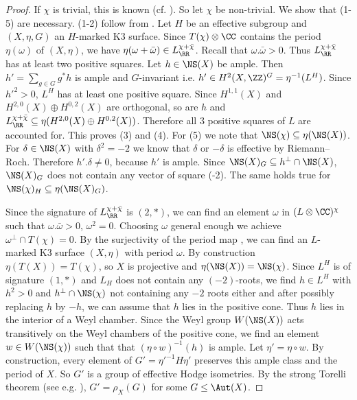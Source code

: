 \begin{proof}
  If $\chi$ is trivial, this is known (cf. \cite[4.2, 4.3]{nikulin1980}).
  So let $\chi$ be non-trivial. We show that (1-5) are necessary. (1-2) follow from \cite[4.2]{nikulin1980}. Let $H$ be an effective subgroup and $(X,\eta,G)$ an $H$-marked K3 surface.
  Since $T(\chi)\otimes \CC$ contains the period $\eta(\omega)$ of $(X,\eta)$, we have $\eta(\omega+\bar \omega) \in L_\RR^{\chi+\bar \chi}$.
  Recall that $\omega.\bar \omega >0$. Thus $L_\RR^{\chi+\bar \chi}$ has at least two positive squares.
  Let $h \in \NS(X)$ be ample. Then $h' = \sum_{g\in G} g^*h$ is ample and $G$-invariant i.e. $h' \in H^2(X,\ZZ)^G=\eta^{-1}(L^H)$. Since $h'^2>0$, $L^H$ has at least one positive square. Since $H^{1,1}(X)$ and $H^{2,0}(X)\oplus H^{0,2}(X)$ are orthogonal, so are $h$ and $L_\RR^{\chi+\bar \chi}\subseteq \eta(H^{2,0}(X)\oplus H^{0,2}(X))$. Therefore all $3$ positive squares of $L$ are accounted for. This proves (3) and (4).
  For (5) we note that $\NS(\chi)\subseteq \eta(\NS(X))$.
  For $\delta \in \NS(X)$ with $\delta^2=-2$ we know that $\delta$ or $-\delta$ is effective by Riemann--Roch.
  Therefore $h'.\delta \neq 0$, because $h'$ is ample.
  Since $\NS(X)_G \subseteq h^\perp \cap \NS(X)$,
  $\NS(X)_G$ does not contain any vector of square (-2).
  The same holds true for $\NS(\chi)_H\subseteq \eta(\NS(X)_G)$.

Since the signature of $L^{\chi+\bar\chi}_\RR$ is $(2,*)$, we can find an element $\omega$ in $(L\otimes \CC)^\chi$ such that
  $\omega.\bar \omega>0$, $\omega^2=0$. Choosing $\omega$ general enough we achieve $\omega^\perp \cap T(\chi) = 0$. By the surjectivity of the period map \cite[VII (14.1)]{bhpv}, we can find an $L$-marked K3 surface $(X,\eta)$ with period $\omega$.
  By construction $\eta(T(X)) = T(\chi)$, so $X$ is projective and $\eta(\NS(X)) = \NS(\chi)$.
Since $L^H$ is of signature $(1,*)$ and $L_H$ does not contain any $(-2)$-roots, we find $h \in L^H$ with $h^2>0$ and $h^\perp \cap \NS(\chi)$ not containing any $-2$ roots either and after possibly replacing $h$ by $-h$, we can assume that $h$ lies in the positive cone. Thus $h$ lies in the interior of a Weyl chamber.
Since the Weyl group $W(\NS(X))$ acts transitively on the Weyl chambers of the positive cone, we find an element $w \in W(\NS(\chi))$ such that that $(\eta\circ w)^{-1}(h)$ is ample. Let $\eta'= \eta\circ w$. By construction, every element of $G' = \eta'^{-1} H \eta'$
preserves this ample class and the period of $X$. So $G'$ is a group of effective Hodge isometries. By the strong Torelli theorem (see e.g. \cite[VIII \S 11]{bhpv}), $G' = \rho_X(G)$ for some $G \leq \Aut(X)$.

\end{proof}

